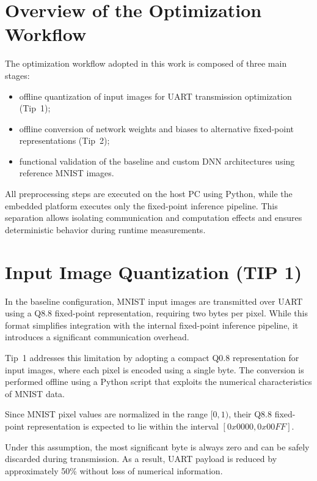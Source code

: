 \section{Overview of the Optimization Workflow}
\label{sec:appendix_workflow}
The optimization workflow adopted in this work is composed of three main stages:

\begin{itemize}
    \item offline quantization of input images for UART transmission optimization (Tip~1);
    \item offline conversion of network weights and biases to alternative fixed-point
          representations (Tip~2);
    \item functional validation of the baseline and custom DNN architectures using
          reference MNIST images.
\end{itemize}

All preprocessing steps are executed on the host PC using Python, while the
embedded platform executes only the fixed-point inference pipeline.
This separation allows isolating communication and computation effects and
ensures deterministic behavior during runtime measurements.



\section{Input Image Quantization (TIP 1)}
\label{sec:appendix_tip1}

In the baseline configuration, MNIST input images are transmitted over UART using
a Q8.8 fixed-point representation, requiring two bytes per pixel.
While this format simplifies integration with the internal fixed-point inference
pipeline, it introduces a significant communication overhead.

Tip~1 addresses this limitation by adopting a compact Q0.8 representation for
input images, where each pixel is encoded using a single byte.
The conversion is performed offline using a Python script that exploits the
numerical characteristics of MNIST data.

Since MNIST pixel values are normalized in the range \([0, 1)\),
their Q8.8 fixed-point representation is expected to lie within the interval
\([0x0000, 0x00FF]\).

Under this assumption, the most significant byte is always zero and can be safely
discarded during transmission.
As a result, UART payload is reduced by approximately 50\% without loss of
numerical information.


